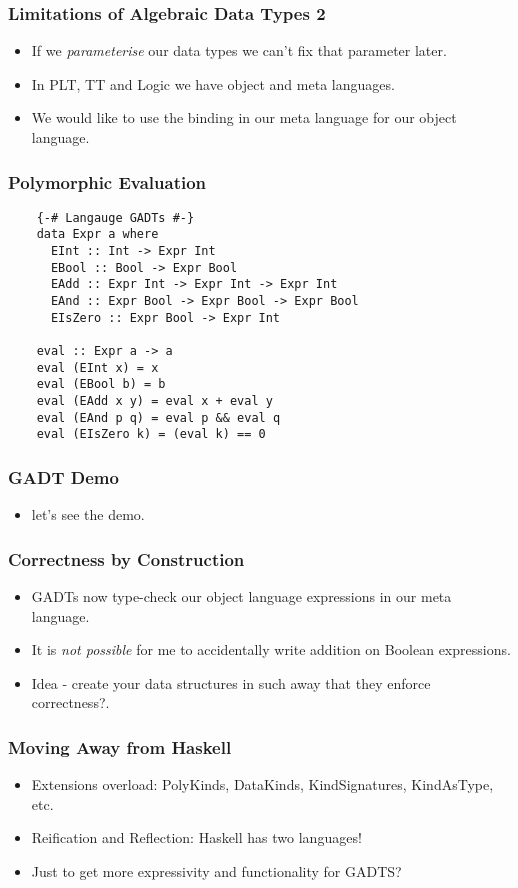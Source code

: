 \documentclass[hyperref={colorlinks = true,linkcolor = blue, citecolor = blue, urlcolor = blue}]{beamer}
\begin{document}
\begin{frame}[fragile]
\frametitle{Limitations of Algebraic Data Types 2}
\begin{itemize}
  \item If we \emph{parameterise} our data types we can't fix that parameter later.
  \item In PLT, TT and Logic we have object and meta languages.
  \item We would like to use the binding in our meta language for our object language.
\end{itemize}
\end{frame}

\begin{frame}[fragile]
\frametitle{Polymorphic Evaluation}
  \begin{verbatim}
    {-# Langauge GADTs #-}
    data Expr a where
      EInt :: Int -> Expr Int
      EBool :: Bool -> Expr Bool
      EAdd :: Expr Int -> Expr Int -> Expr Int
      EAnd :: Expr Bool -> Expr Bool -> Expr Bool
      EIsZero :: Expr Bool -> Expr Int

    eval :: Expr a -> a
    eval (EInt x) = x
    eval (EBool b) = b
    eval (EAdd x y) = eval x + eval y
    eval (EAnd p q) = eval p && eval q
    eval (EIsZero k) = (eval k) == 0
  \end{verbatim}
\end{frame}

\begin{frame}[fragile]
\frametitle{GADT Demo}
  \begin{itemize}
    \item let's see the demo.
  \end{itemize}
\end{frame}

\begin{frame}[fragile]
\frametitle{Correctness by Construction}
\begin{itemize}
  \item GADTs now type-check our object language expressions in our meta language.
  \item It is \emph{not possible} for me to accidentally write addition on Boolean expressions.
  \item Idea - create your data structures in such away that they enforce correctness?.
\end{itemize}
\end{frame}

\begin{frame}[fragile]
  \frametitle{Moving Away from Haskell}
  \begin{itemize}
    \item Extensions overload: PolyKinds, DataKinds, KindSignatures, KindAsType, etc.
    \item Reification and Reflection: Haskell has two languages!
    \item Just to get more expressivity and functionality for GADTS?
  \end{itemize}
\end{frame}
\end{document}

